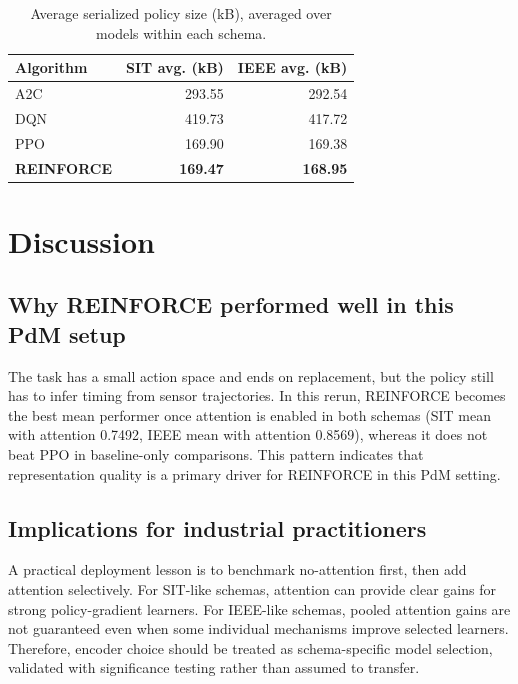 \documentclass[sn-basic]{sn-jnl}%
\begin{document}
\begin{table}[htbp]
\centering
\caption{Average serialized policy size (kB), averaged over models within each schema.}
\label{tab:model_size_summary}
\begin{tabular}{l r r}
\toprule
	\textbf{Algorithm} & \textbf{SIT avg. (kB)} & \textbf{IEEE avg. (kB)}\\
	\midrule
	A2C & 293.55 & 292.54\\
	DQN & 419.73 & 417.72\\
	PPO & 169.90 & 169.38\\
	\textbf{REINFORCE} & \textbf{169.47} & \textbf{168.95}\\
\bottomrule
\end{tabular}
\end{table}

\section{Discussion}
\label{sec:discussion}
\subsection{Why REINFORCE performed well in this PdM setup}
The task has a small action space and ends on replacement, but the policy still has to infer timing from sensor trajectories. In this rerun, \textsc{REINFORCE} becomes the best mean performer once attention is enabled in both schemas (SIT mean with attention 0.7492, IEEE mean with attention 0.8569), whereas it does not beat \textsc{PPO} in baseline-only comparisons. This pattern indicates that representation quality is a primary driver for \textsc{REINFORCE} in this PdM setting.

\subsection{Implications for industrial practitioners}
A practical deployment lesson is to benchmark no-attention first, then add attention selectively. For SIT-like schemas, attention can provide clear gains for strong policy-gradient learners. For IEEE-like schemas, pooled attention gains are not guaranteed even when some individual mechanisms improve selected learners. Therefore, encoder choice should be treated as schema-specific model selection, validated with significance testing rather than assumed to transfer.
\end{document}
